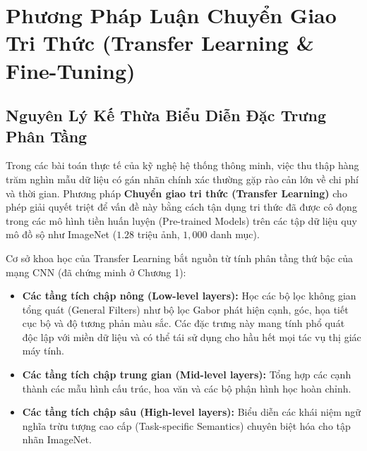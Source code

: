 \documentclass[12pt,a4paper]{report}
\begin{document}
\section{Phương Pháp Luận Chuyển Giao Tri Thức (Transfer Learning \& Fine-Tuning)}

\subsection{Nguyên Lý Kế Thừa Biểu Diễn Đặc Trưng Phân Tầng}
Trong các bài toán thực tế của kỹ nghệ hệ thống thông minh, việc thu thập hàng trăm nghìn mẫu dữ liệu có gán nhãn chính xác thường gặp rào cản lớn về chi phí và thời gian. Phương pháp \textbf{Chuyển giao tri thức (Transfer Learning)} cho phép giải quyết triệt để vấn đề này bằng cách tận dụng tri thức đã được cô đọng trong các mô hình tiền huấn luyện (Pre-trained Models) trên các tập dữ liệu quy mô đồ sộ như ImageNet ($1.28$ triệu ảnh, $1,000$ danh mục).

Cơ sở khoa học của Transfer Learning bắt nguồn từ tính phân tầng thứ bậc của mạng CNN (đã chứng minh ở Chương 1):
\begin{itemize}[leftmargin=*]
    \item \textbf{Các tầng tích chập nông (Low-level layers):} Học các bộ lọc không gian tổng quát (General Filters) như bộ lọc Gabor phát hiện cạnh, góc, họa tiết cục bộ và độ tương phản màu sắc. Các đặc trưng này mang tính phổ quát độc lập với miền dữ liệu và có thể tái sử dụng cho hầu hết mọi tác vụ thị giác máy tính.
    \item \textbf{Các tầng tích chập trung gian (Mid-level layers):} Tổng hợp các cạnh thành các mẫu hình cấu trúc, hoa văn và các bộ phận hình học hoàn chỉnh.
    \item \textbf{Các tầng tích chập sâu (High-level layers):} Biểu diễn các khái niệm ngữ nghĩa trừu tượng cao cấp (Task-specific Semantics) chuyên biệt hóa cho tập nhãn ImageNet.
\end{itemize}
\end{document}
